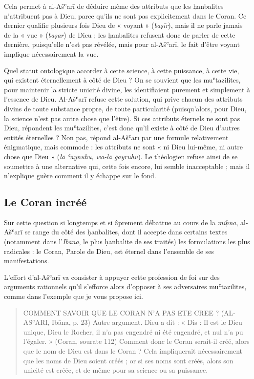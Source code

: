 Cela permet à al-Ašʿarī de déduire même des attributs que les ḥanbalites
n'attribuent pas à Dieu, parce qu'ils ne sont pas explicitement dans le
Coran. Ce dernier qualifie plusieurs fois Dieu de « voyant »
(\emph{baṣīr}), mais il ne parle jamais de la « vue » (\emph{baṣar}) de
Dieu ; les ḥanbalites refusent donc de parler de cette dernière,
puisqu'elle n'est pas révélée, mais pour al-Ašʿarī, le fait d'être
voyant implique nécessairement la vue.

Quel statut ontologique accorder à cette science, à cette puissance, à
cette vie, qui existent éternellement à côté de Dieu ? On se souvient
que les muʿtazilites, pour maintenir la stricte unicité divine, les
identifiaient purement et simplement à l'essence de Dieu. Al-Ašʿarī
refuse cette solution, qui prive chacun des attributs divins de toute
substance propre, de toute particularité (puisqu'alors, pour Dieu, la
science n'est pas autre chose que l'être). Si ces attributs éternels ne
sont pas Dieu, répondent les muʿtazilites, c'est donc qu'il existe à
côté de Dieu d'autres entités éternelles ? Non pas, répond al-Ašʿarī par
une formule relativement énigmatique, mais commode : les attributs ne
sont « ni Dieu lui-même, ni autre chose que Dieu » (\emph{lā ʿaynuhu,
wa-lā ġayruhu}). Le théologien refuse ainsi de se soumettre à une
alternative qui, cette fois encore, lui semble inacceptable ; mais il
n'explique guère comment il y échappe sur le fond.


  \subsection{Le Coran incréé}


Sur cette question si longtemps et si âprement débattue au cours de la
\emph{miḥna}, al-Ašʿarī se range du côté des ḥanbalites, dont il accepte
dans certains textes (notamment dans l'\emph{Ibāna}, le plus ḥanbalite
de ses traités) les formulations les plus radicales : le Coran, Parole
de Dieu, est éternel dans l'ensemble de ses manifestations.

L'effort d'al-Ašʿarī va consister à appuyer cette profession de foi sur
des arguments rationnels qu'il s'efforce alors d'opposer à ses
adversaires muʿtazilites, comme dans l'exemple que je vous propose ici.
\begin{quote}
    COMMENT SAVOIR QUE LE CORAN N’A PAS ETE CREE ? (AL-ASʿARI, Ibāna, p. 23)
Autre argument. Dieu a dit : « Dis : Il est le Dieu unique, Dieu le Rocher, il n’a pas engendré ni été engendré, et nul n’a pu l’égaler. » (Coran, sourate 112) Comment donc le Coran serait-il créé, alors que le nom de Dieu est dans le Coran ? Cela impliquerait nécessairement que les noms de Dieu soient créés ; or si ses noms sont créés, alors son unicité est créée, et de même pour sa science ou sa puissance.
\end{quote}


